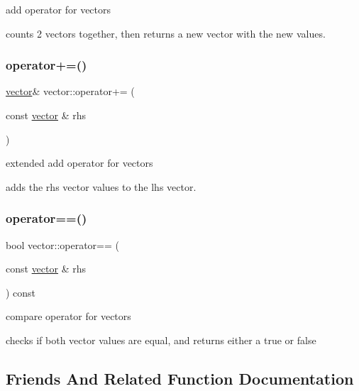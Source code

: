 add operator for vectors 

counts 2 vectors together, then returns a new vector with the new values. \mbox{\label{classvector_acf4c6a4d343c92e211f80de7712a3cac}} 
\subsubsection{\texorpdfstring{operator+=()}{operator+=()}}
{\footnotesize\ttfamily \hyperlink{classvector}{vector}\& vector\+::operator+= (\begin{DoxyParamCaption}\item[{const \hyperlink{classvector}{vector} \&}]{rhs }\end{DoxyParamCaption})\hspace{0.3cm}{\ttfamily [inline]}}



extended add operator for vectors 

adds the rhs vector values to the lhs vector. \mbox{\label{classvector_a0066b879f704f7d344ec9cd2a2f57ea3}} 
\subsubsection{\texorpdfstring{operator==()}{operator==()}}
{\footnotesize\ttfamily bool vector\+::operator== (\begin{DoxyParamCaption}\item[{const \hyperlink{classvector}{vector} \&}]{rhs }\end{DoxyParamCaption}) const\hspace{0.3cm}{\ttfamily [inline]}}



compare operator for vectors 

checks if both vector values are equal, and returns either a true or false 

\subsection{Friends And Related Function Documentation}
\mbox{\label{classvector_a7a6813f75dabd6f9575f9d6f91890255}} 
